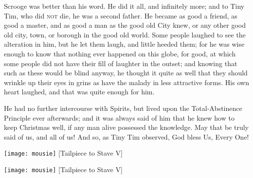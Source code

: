 Scrooge was better than his word. He did it all, and infinitely more; and to Tiny Tim, who did \textsc{not} die, he was a second father. He became as good a friend, as good a master, and as good a man as the good old City knew, or any other good old city, town, or borough in the good old world. Some people laughed to see the alteration in him, but he let them laugh, and little heeded them; for he was wise enough to know that nothing ever happened on this globe, for good, at which some people did not have their fill of laughter in the outset; and knowing that such as these would be blind anyway, he thought it quite as well that they should wrinkle up their eyes in grins as have the malady in less attractive forms. His own heart laughed, and that was quite enough for him.

He had no further intercourse with Spirits, but lived upon the Total-Abstinence Principle ever afterwards; and it was always said of him that he knew how to keep Christmas well, if any man alive possessed the knowledge. May that be truly said of us, and all of us! And so, as Tiny Tim observed, God bless Us, Every One!

\makeatletter
{}
{%
	\begin{center}
		\texttt{[image: mousie]}
		[Tailpiece to Stave V]{}
	\end{center}
	\enlargethispage {\baselineskip} 
}{%
	\begin{center}
		\texttt{[image: mousie]}
		[Tailpiece to Stave V]{}
	\end{center}
	\enlargethispage {\baselineskip} 
	\clearpage
}
\makeatother